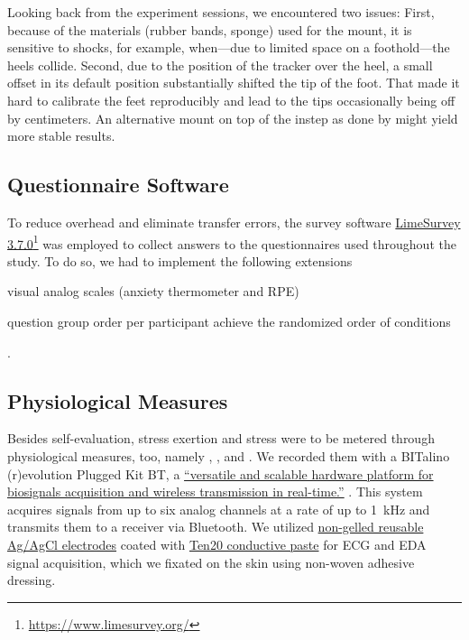 

Looking back from the experiment sessions, we encountered two issues: First, because of the materials (rubber bands, sponge) used for the mount, it is sensitive to shocks, for example, when---due to limited space on a foothold---the heels collide. Second, due to the position of the tracker over the heel, a small offset in its default position substantially shifted the tip of the foot. That made it hard to calibrate the feet reproducibly and lead to the tips occasionally being off by centimeters. An alternative mount on top of the instep as done by \textcite{Tiator2018} might yield more stable results.

\subsection{Questionnaire Software}

To reduce overhead and eliminate transfer errors, the survey software \href{https://www.limesurvey.org/}{LimeSurvey 3.7.0}\footnote{\url{https://www.limesurvey.org/}} was employed to collect answers to the questionnaires used throughout the study. To do so, we had to implement the following extensions\begin{inlinelist}
	\item visual analog scales (anxiety thermometer and \gls{RPE})
	\item question group order per participant achieve the randomized order of conditions
\end{inlinelist}.

\subsection{Physiological Measures}

Besides self-evaluation, stress exertion and stress were to be metered through physiological measures, too, namely , , and . We recorded them with a BITalino (r)evolution Plugged Kit BT, a \href{http://bitalino.com/en/plugged-kit-bt}{“versatile and scalable hardware platform for biosignals acquisition and wireless transmission in real-time.”} \autocite{BITalinoBoardKit}. This system acquires signals from up to six analog channels at a rate of up to \SI{1}{\kilo\hertz} and transmits them to a receiver via Bluetooth. We utilized \href{https://store.plux.info/electrodes/60-non-gelled-reusable-agagcl-electrodes.html}{non-gelled reusable Ag/AgCl electrodes} coated with \href{https://store.plux.info/electrodes/70-ten20-conductive-paste-for-eeg-810122129.html}{Ten20 conductive paste} for \gls{ECG} and \gls{EDA} signal acquisition, which we fixated on the skin using non-woven adhesive dressing.

